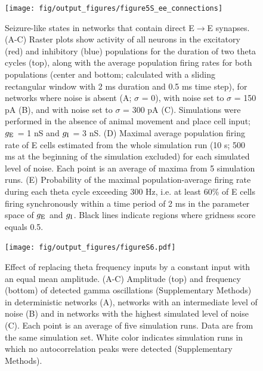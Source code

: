 \documentclass[a4paper,12pt]{article}
\newcommand{\ssc}[3]{\ensuremath{#1_{\text{#2}_{\text{#3}}}}}
\newcommand{\gE      }{\ssc{g}      {\scriptsize{E}}{}}
\newcommand{\gI      }{\ssc{g}      {\scriptsize{I}}{}}
\begin{document}
\clearpage

\begin{figure}[p]
    \internallinenumbers
    \centering
        \texttt{[image: fig/output\_figures/figure5S\_ee\_connections]}
\end{figure}

\clearpage

\begin{figure}[H]
    \internallinenumbers
    \caption{Seizure-like states in networks that contain direct
    E$\rightarrow$E synapses. (A-C) Raster plots show activity of all neurons
    in the excitatory (red) and inhibitory (blue) populations for the duration
    of two theta cycles (top), along with the average population firing rates
    for both populations (center and bottom; calculated with a sliding
    rectangular window with 2 ms duration and 0.5 ms time step), for networks
    where noise is absent (A; $\sigma$ = 0), with noise set to $\sigma$ = 150
    pA (B), and with noise set to $\sigma$ = 300 pA (C). Simulations were
    performed in the absence of animal movement and place cell input; $\gE$ = 1 nS
    and $\gI$ = 3 nS.  (D) Maximal average population firing rate of E cells
    estimated from the whole simulation run (10 s; 500 ms at the beginning of
    the simulation excluded) for each simulated level of noise. Each point is
    an average of maxima from 5 simulation runs.  (E) Probability of the
    maximal population-average firing rate during each theta cycle exceeding
    300 Hz, i.e. at least 60\% of E cells firing synchronously within a time
    period of 2 ms in the parameter space of $\gE$ and $\gI$. Black lines indicate
    regions where gridness score equals 0.5.}
\end{figure}

\clearpage


\setcounter{figure}{0}
\renewcommand{\figurename}{Figure 6 - figure supplement}

\begin{figure}[ht!]
    \internallinenumbers
    \centering
        \texttt{[image: fig/output\_figures/figureS6.pdf]}
    \caption{Effect of replacing theta frequency inputs by a constant input
    with an equal mean amplitude. (A-C) Amplitude (top) and frequency (bottom)
    of detected gamma oscillations (Supplementary Methods) in deterministic
    networks (A), networks with an intermediate level of noise (B) and in
    networks with the highest simulated level of noise (C). Each point is an
    average of five simulation runs. Data are from the same simulation set.
    White color indicates simulation runs in which no autocorrelation peaks
    were detected (Supplementary Methods).}
\end{figure}
\end{document}
